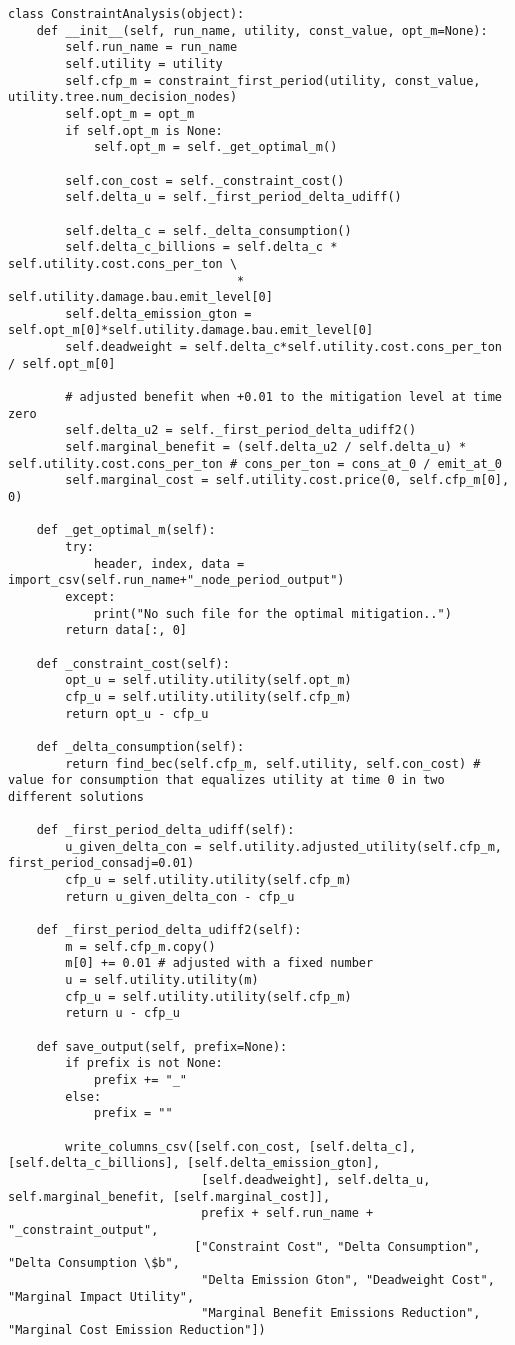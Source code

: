 \documentclass[12pt]{article}
\begin{document}
\begin{verbatim}
class ConstraintAnalysis(object):
	def __init__(self, run_name, utility, const_value, opt_m=None):
		self.run_name = run_name
		self.utility = utility
		self.cfp_m = constraint_first_period(utility, const_value, utility.tree.num_decision_nodes)
		self.opt_m = opt_m
		if self.opt_m is None:
			self.opt_m = self._get_optimal_m()

		self.con_cost = self._constraint_cost()
		self.delta_u = self._first_period_delta_udiff()

		self.delta_c = self._delta_consumption()
		self.delta_c_billions = self.delta_c * self.utility.cost.cons_per_ton \
								* self.utility.damage.bau.emit_level[0]
		self.delta_emission_gton = self.opt_m[0]*self.utility.damage.bau.emit_level[0]
		self.deadweight = self.delta_c*self.utility.cost.cons_per_ton / self.opt_m[0]

		# adjusted benefit when +0.01 to the mitigation level at time zero
		self.delta_u2 = self._first_period_delta_udiff2()
		self.marginal_benefit = (self.delta_u2 / self.delta_u) * self.utility.cost.cons_per_ton # cons_per_ton = cons_at_0 / emit_at_0
		self.marginal_cost = self.utility.cost.price(0, self.cfp_m[0], 0)

	def _get_optimal_m(self):
		try:
			header, index, data = import_csv(self.run_name+"_node_period_output")
		except:
			print("No such file for the optimal mitigation..")
		return data[:, 0]

	def _constraint_cost(self):
		opt_u = self.utility.utility(self.opt_m)
		cfp_u = self.utility.utility(self.cfp_m)
		return opt_u - cfp_u

	def _delta_consumption(self):
		return find_bec(self.cfp_m, self.utility, self.con_cost) # value for consumption that equalizes utility at time 0 in two different solutions

	def _first_period_delta_udiff(self):
		u_given_delta_con = self.utility.adjusted_utility(self.cfp_m, first_period_consadj=0.01)
		cfp_u = self.utility.utility(self.cfp_m)
		return u_given_delta_con - cfp_u

	def _first_period_delta_udiff2(self):
		m = self.cfp_m.copy()
		m[0] += 0.01 # adjusted with a fixed number
		u = self.utility.utility(m)
		cfp_u = self.utility.utility(self.cfp_m)
		return u - cfp_u
		
	def save_output(self, prefix=None):
		if prefix is not None:
			prefix += "_"
		else:
			prefix = ""

		write_columns_csv([self.con_cost, [self.delta_c], [self.delta_c_billions], [self.delta_emission_gton],
						   [self.deadweight], self.delta_u, self.marginal_benefit, [self.marginal_cost]],
						   prefix + self.run_name + "_constraint_output",
						  ["Constraint Cost", "Delta Consumption", "Delta Consumption \$b",
						   "Delta Emission Gton", "Deadweight Cost", "Marginal Impact Utility",
						   "Marginal Benefit Emissions Reduction", "Marginal Cost Emission Reduction"])
\end{verbatim}
\end{document}
